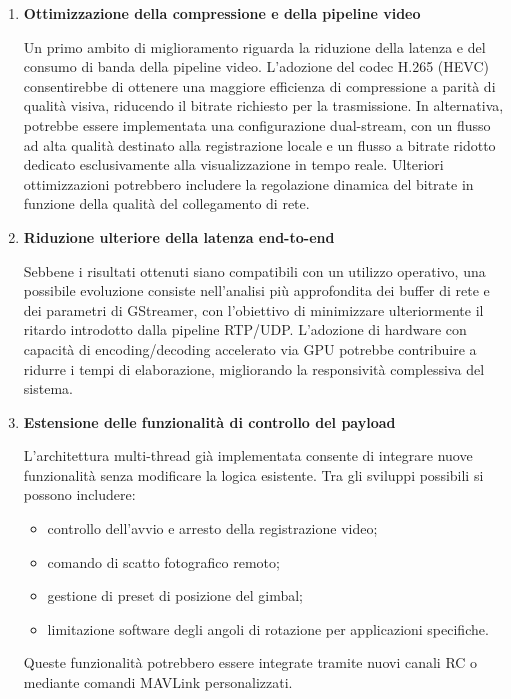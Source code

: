 \begin{enumerate}

\item \textbf{Ottimizzazione della compressione e della pipeline video}

Un primo ambito di miglioramento riguarda la riduzione della latenza e del
consumo di banda della pipeline video. L’adozione del codec H.265 (HEVC)
consentirebbe di ottenere una maggiore efficienza di compressione a parità
di qualità visiva, riducendo il bitrate richiesto per la trasmissione.
In alternativa, potrebbe essere implementata una configurazione dual-stream,
con un flusso ad alta qualità destinato alla registrazione locale e un flusso
a bitrate ridotto dedicato esclusivamente alla visualizzazione in tempo reale.
Ulteriori ottimizzazioni potrebbero includere la regolazione dinamica del
bitrate in funzione della qualità del collegamento di rete.

\item \textbf{Riduzione ulteriore della latenza end-to-end}

Sebbene i risultati ottenuti siano compatibili con un utilizzo operativo,
una possibile evoluzione consiste nell’analisi più approfondita dei buffer
di rete e dei parametri di GStreamer, con l’obiettivo di minimizzare
ulteriormente il ritardo introdotto dalla pipeline RTP/UDP.
L’adozione di hardware con capacità di encoding/decoding accelerato
via GPU potrebbe contribuire a ridurre i tempi di elaborazione,
migliorando la responsività complessiva del sistema.

\item \textbf{Estensione delle funzionalità di controllo del payload}

L’architettura multi-thread già implementata consente di integrare nuove
funzionalità senza modificare la logica esistente. Tra gli sviluppi possibili
si possono includere:
\begin{itemize}
    \item controllo dell’avvio e arresto della registrazione video;
    \item comando di scatto fotografico remoto;
    \item gestione di preset di posizione del gimbal;
    \item limitazione software degli angoli di rotazione per applicazioni specifiche.
\end{itemize}
Queste funzionalità potrebbero essere integrate tramite nuovi canali RC
o mediante comandi MAVLink personalizzati.



\end{enumerate}
